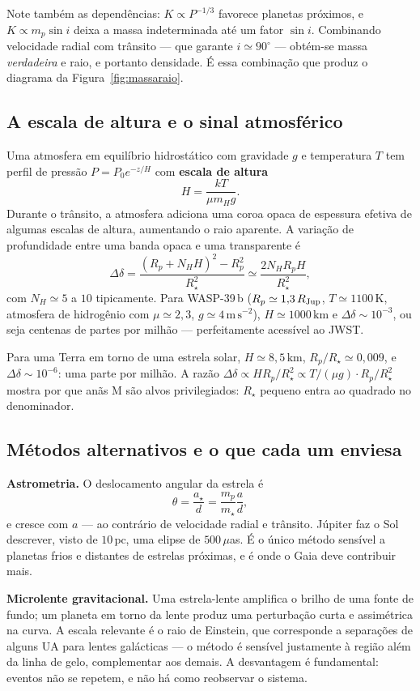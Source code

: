 \documentclass[11pt,a4paper]{article}
\begin{document}
Note também as dependências: $K\propto P^{-1/3}$ favorece planetas próximos, e $K\propto m_p\sin i$ deixa a massa indeterminada até um fator $\sin i$. Combinando velocidade radial com trânsito --- que garante $i\simeq90^\circ$ --- obtém-se massa \emph{verdadeira} e raio, e portanto densidade. É essa combinação que produz o diagrama da Figura~\ref{fig:massaraio}.

\subsection*{A escala de altura e o sinal atmosférico}

Uma atmosfera em equilíbrio hidrostático com gravidade $g$ e temperatura $T$ tem perfil de pressão $P=P_0e^{-z/H}$ com \textbf{escala de altura}
\[
H=\frac{kT}{\mu m_Hg}.
\]
Durante o trânsito, a atmosfera adiciona uma coroa opaca de espessura efetiva de algumas escalas de altura, aumentando o raio aparente. A variação de profundidade entre uma banda opaca e uma transparente é
\[
\Delta\delta=\frac{(R_p+N_HH)^{2}-R_p^{2}}{R_\star^{2}}\simeq\frac{2N_HR_pH}{R_\star^{2}},
\]
com $N_H\simeq5$ a $10$ tipicamente. Para WASP-39\,b ($R_p\simeq1{,}3\,R_{\rm Jup}$, $T\simeq1100\,\mathrm{K}$, atmosfera de hidrogênio com $\mu\simeq2{,}3$, $g\simeq4\,\mathrm{m\,s^{-2}}$), $H\simeq1000\,\mathrm{km}$ e $\Delta\delta\sim10^{-3}$, ou seja centenas de partes por milhão --- perfeitamente acessível ao JWST.

Para uma Terra em torno de uma estrela solar, $H\simeq8{,}5\,\mathrm{km}$, $R_p/R_\star\simeq0{,}009$, e $\Delta\delta\sim10^{-6}$: uma parte por milhão. A razão $\Delta\delta\propto H R_p/R_\star^{2}\propto T/(\mu g)\cdot R_p/R_\star^{2}$ mostra por que anãs M são alvos privilegiados: $R_\star$ pequeno entra ao quadrado no denominador.

\subsection*{Métodos alternativos e o que cada um enviesa}

\textbf{Astrometria.} O deslocamento angular da estrela é
\[
\theta=\frac{a_\star}{d}=\frac{m_p}{m_\star}\frac{a}{d},
\]
e cresce com $a$ --- ao contrário de velocidade radial e trânsito. Júpiter faz o Sol descrever, visto de $10\,\mathrm{pc}$, uma elipse de $500\,\mu$as. É o único método sensível a planetas frios e distantes de estrelas próximas, e é onde o Gaia deve contribuir mais.

\textbf{Microlente gravitacional.} Uma estrela-lente amplifica o brilho de uma fonte de fundo; um planeta em torno da lente produz uma perturbação curta e assimétrica na curva. A escala relevante é o raio de Einstein, que corresponde a separações de alguns UA para lentes galácticas --- o método é sensível justamente à região além da linha de gelo, complementar aos demais. A desvantagem é fundamental: eventos não se repetem, e não há como reobservar o sistema.
\end{document}
